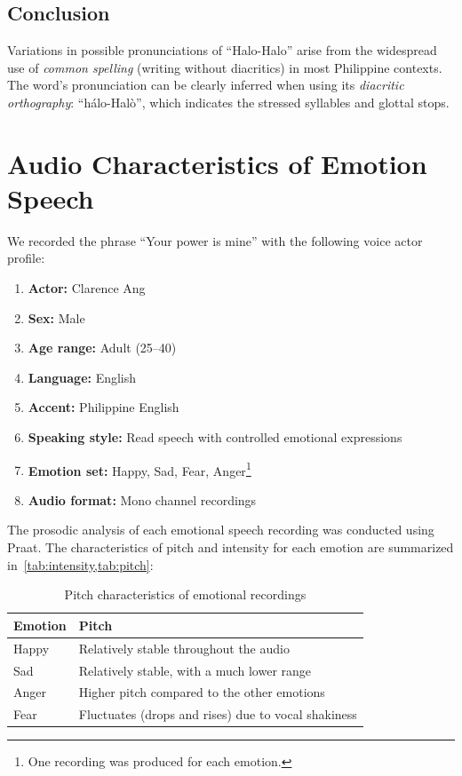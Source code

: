 \documentclass{article}
\begin{document}
	\subsection{Conclusion}
	
	Variations in possible pronunciations of ``Halo-Halo'' arise from the
	widespread use of \emph{common spelling} (writing without diacritics) in most
	Philippine contexts. The word's pronunciation can be clearly inferred when
	using its \emph{diacritic orthography}: ``h\'alo-Hal\`o'', which indicates the
	stressed syllables and glottal stops.
	
	\section{Audio Characteristics of Emotion Speech}
	
	We recorded the phrase ``Your power is mine'' with the following voice actor
	profile:
	
	\begin{enumerate}
		\item \textbf{Actor:} Clarence Ang
		\item \textbf{Sex:} Male
		\item \textbf{Age range:} Adult (25--40)
		\item \textbf{Language:} English
		\item \textbf{Accent:} Philippine English
		\item \textbf{Speaking style:} Read speech with controlled emotional expressions
		\item \textbf{Emotion set:} Happy, Sad, Fear, Anger\footnote{One recording was produced for each emotion.}
		\item \textbf{Audio format:} Mono channel recordings
	\end{enumerate}
	
	The prosodic analysis of each emotional speech recording was conducted using
	Praat. The characteristics of pitch and intensity for each emotion are
	summarized in~\cref{tab:intensity,tab:pitch}:
	
	\begin{table}[h]
		\centering
		\caption{Pitch characteristics of emotional recordings}
		\begin{tabular}{ll}
			\hline
			\textbf{Emotion} & \textbf{Pitch}                                      \\
			\hline
			Happy            & Relatively stable throughout the audio              \\
			Sad              & Relatively stable, with a much lower range          \\
			Anger            & Higher pitch compared to the other emotions         \\
			Fear             & Fluctuates (drops and rises) due to vocal shakiness \\
			\hline
		\end{tabular}\label{tab:pitch}
	\end{table}
	
\end{document}
